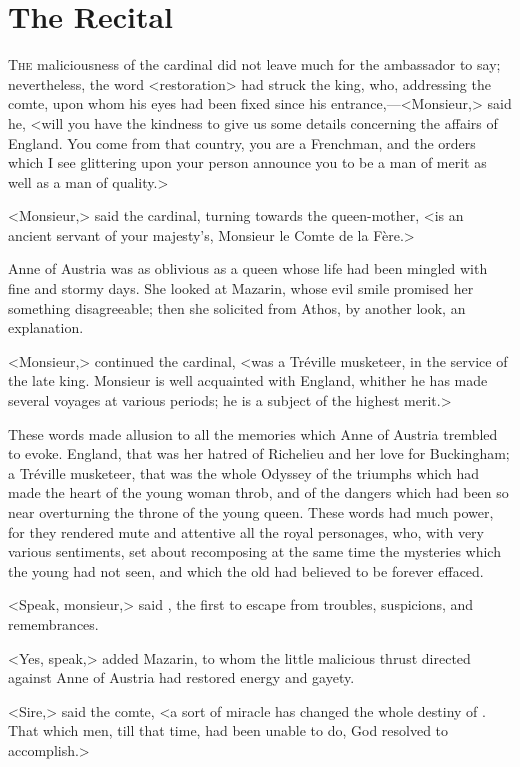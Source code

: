 \chapter{The Recital}

\lettrine{T}{he} maliciousness of the cardinal did not leave much for the ambassador to say; nevertheless, the word <restoration> had struck the king, who, addressing the comte, upon whom his eyes had been fixed since his entrance,—<Monsieur,> said he, <will you have the kindness to give us some details concerning the affairs of England. You come from that country, you are a Frenchman, and the orders which I see glittering upon your person announce you to be a man of merit as well as a man of quality.>

<Monsieur,> said the cardinal, turning towards the queen-mother, <is an ancient servant of your majesty's, Monsieur le Comte de la Fère.>

Anne of Austria was as oblivious as a queen whose life had been mingled with fine and stormy days. She looked at Mazarin, whose evil smile promised her something disagreeable; then she solicited from Athos, by another look, an explanation.

<Monsieur,> continued the cardinal, <was a Tréville musketeer, in the service of the late king. Monsieur is well acquainted with England, whither he has made several voyages at various periods; he is a subject of the highest merit.>

These words made allusion to all the memories which Anne of Austria trembled to evoke. England, that was her hatred of Richelieu and her love for Buckingham; a Tréville musketeer, that was the whole Odyssey of the triumphs which had made the heart of the young woman throb, and of the dangers which had been so near overturning the throne of the young queen. These words had much power, for they rendered mute and attentive all the royal personages, who, with very various sentiments, set about recomposing at the same time the mysteries which the young had not seen, and which the old had believed to be forever effaced.

<Speak, monsieur,> said , the first to escape from troubles, suspicions, and remembrances.

<Yes, speak,> added Mazarin, to whom the little malicious thrust directed against Anne of Austria had restored energy and gayety.

<Sire,> said the comte, <a sort of miracle has changed the whole destiny of . That which men, till that time, had been unable to do, God resolved to accomplish.>

